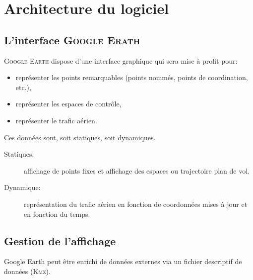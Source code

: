 


\section{Architecture du logiciel}
    \subsection{L'interface \textsc{Google Erath}}
\textsc{Google Earth} dispose d’une interface graphique qui sera mise à profit pour:
\begin{itemize}
\item représenter les points remarquables (points nommés, points de coordination, etc.),
\item représenter les espaces de contrôle,
\item représenter le trafic aérien.
\end{itemize}\medskip

Ces données sont, soit statiques, soit dynamiques.
\begin{description}
\item[Statiques:] affichage de points fixes et affichage des espaces ou trajectoire plan de vol. 
\item[Dynamique:] représentation du trafic aérien en fonction de coordonnées mises à jour et en fonction du temps.
\end{description}\medskip

    \subsection{Gestion de l'affichage}
Google Earth peut être enrichi de données externes via un fichier descriptif de données (\textsc{Kmz}).

